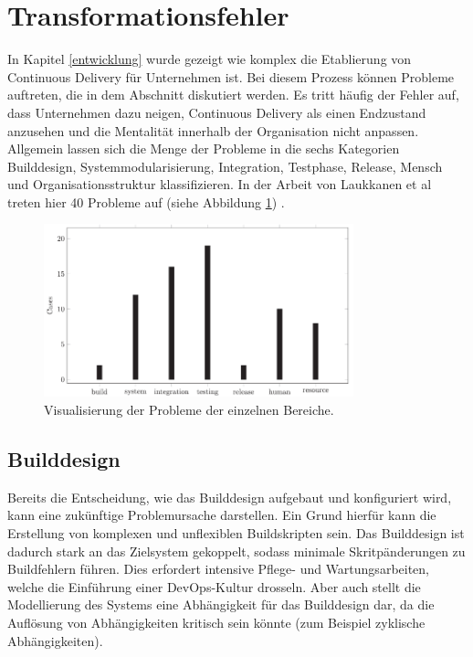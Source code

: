 \section{Transformationsfehler} \label{Fehler bei der Transformation}
In Kapitel \ref{entwicklung} wurde gezeigt wie komplex die Etablierung von Continuous Delivery für Unternehmen ist. Bei diesem Prozess können Probleme auftreten, die in dem Abschnitt diskutiert werden. Es tritt häufig der Fehler auf, dass Unternehmen dazu neigen, Continuous Delivery als einen Endzustand anzusehen und die Mentalität innerhalb der Organisation nicht anpassen. Allgemein lassen sich die Menge der Probleme in die sechs Kategorien Builddesign, Systemmodularisierung, Integration, Testphase, Release, Mensch und Organisationsstruktur klassifizieren. In der Arbeit von Laukkanen et al treten hier 40 Probleme auf (siehe Abbildung \ref{studie}) \cite{Laukkanen.2017}. 

\begin{figure}[ht]
	\centering
	\includegraphics[width=0.8\textwidth,]{images/Transformationproblems}
	\caption{Visualisierung der Probleme der einzelnen Bereiche\cite{Laukkanen.2017}.}
	\label{studie}
\end{figure}

\subsection{Builddesign} \label{builddesgin}
Bereits die Entscheidung, wie das Builddesign aufgebaut und konfiguriert wird, kann eine zukünftige Problemursache darstellen. Ein Grund hierfür kann die Erstellung von komplexen und unflexiblen Buildskripten sein. Das Builddesign ist dadurch stark an das Zielsystem gekoppelt, sodass minimale Skritpänderungen zu Buildfehlern führen. Dies erfordert intensive Pflege- und Wartungsarbeiten, welche die Einführung einer DevOps-Kultur drosseln. Aber auch stellt die Modellierung des Systems eine Abhängigkeit für das Builddesign dar, da die Auflösung von Abhängigkeiten kritisch sein könnte (zum Beispiel zyklische Abhängigkeiten).

